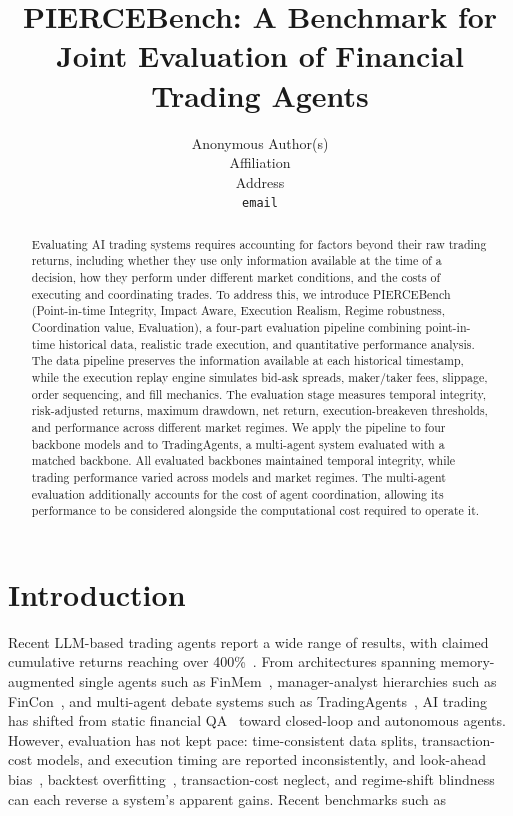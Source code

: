 \documentclass{article}
\title{PIERCEBench: A Benchmark for Joint Evaluation of Financial Trading Agents}
\author{%
  Anonymous Author(s) \\
  Affiliation \\
  Address \\
  \texttt{email} \\
}
\begin{document}
\maketitle

\begin{abstract}

Evaluating AI trading systems requires accounting for factors beyond their raw trading returns, including whether they use only information available at the time of a decision, how they perform under different market conditions, and the costs of executing and coordinating trades. To address this, we introduce PIERCEBench (Point-in-time Integrity, Impact Aware, Execution Realism, Regime robustness, Coordination value, Evaluation), a four-part evaluation pipeline combining point-in-time historical data, realistic trade execution, and quantitative performance analysis. The data pipeline preserves the information available at each historical timestamp, while the execution replay engine simulates bid-ask spreads, maker/taker fees, slippage, order sequencing, and fill mechanics. The evaluation stage measures temporal integrity, risk-adjusted returns, maximum drawdown, net return, execution-breakeven thresholds, and performance across different market regimes. We apply the pipeline to four backbone models and to TradingAgents, a multi-agent system evaluated with a matched backbone. All evaluated backbones maintained temporal integrity, while trading performance varied across models and market regimes. The multi-agent evaluation additionally accounts for the cost of agent coordination, allowing its performance to be considered alongside the computational cost required to operate it.

\end{abstract}

\section{Introduction}

Recent LLM-based trading agents report a wide range of results, with claimed cumulative returns reaching over 400\%~\cite{li2025hedgeagents}. From architectures spanning memory-augmented single agents such as FinMem~\cite{yu2023finmem}, manager-analyst hierarchies such as FinCon~\cite{yu2024fincon}, and multi-agent debate systems such as TradingAgents~\cite{xiao2024ta}, AI trading has shifted from static financial QA~\cite{chen2021finqa} toward closed-loop and autonomous agents. However, evaluation has not kept pace: time-consistent data splits, transaction-cost models, and execution timing are reported inconsistently, and look-ahead bias~\cite{benhenda2026}, backtest overfitting~\cite{bailey2014}, transaction-cost neglect, and regime-shift blindness can each reverse a system's apparent gains. Recent benchmarks such as
\end{document}
